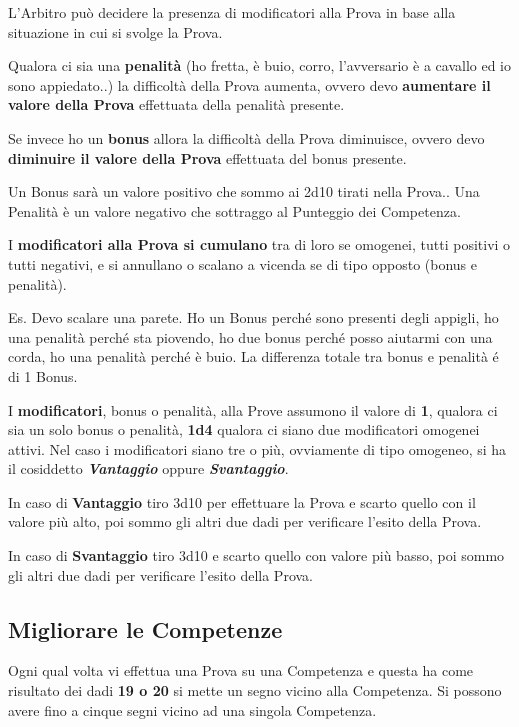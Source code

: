 \documentclass[12pt,a4paper,twoside,openany]{book}
\begin{document}
\begin{multicols}{2}
L'Arbitro può decidere la presenza di modificatori alla Prova in base alla situazione in cui si svolge la Prova.

Qualora ci sia una \textbf{penalità} (ho fretta, è buio, corro, l'avversario è a cavallo ed io sono appiedato..) la difficoltà della Prova aumenta, ovvero devo \textbf{aumentare il valore della Prova} effettuata della penalità presente.

Se invece ho un \textbf{bonus} allora la difficoltà della Prova diminuisce, ovvero devo \textbf{diminuire il valore della Prova} effettuata del bonus presente.

Un Bonus sarà un valore positivo che sommo ai 2d10 tirati nella Prova.. Una Penalità è un valore negativo che sottraggo al Punteggio dei Competenza.

I \textbf{modificatori alla Prova si cumulano} tra di loro se omogenei, tutti positivi o tutti negativi, e si annullano o scalano a vicenda se di tipo opposto (bonus e penalità).

Es. Devo scalare una parete. Ho un Bonus perché sono presenti degli appigli, ho una penalità perché sta piovendo, ho due bonus perché posso aiutarmi con una corda, ho una penalità perché è buio. La differenza totale tra bonus e penalità é di 1 Bonus.

I \textbf{modificatori}, bonus o penalità, alla Prove assumono il valore di \textbf{1}, qualora ci sia un solo bonus o penalità, \textbf{1d4} qualora ci siano due modificatori omogenei attivi. Nel caso i modificatori siano tre o più, ovviamente di tipo omogeneo, si ha il cosiddetto \textbf{\textit{Vantaggio}} oppure \textbf{\textit{Svantaggio}}.

In caso di \textbf{Vantaggio} tiro 3d10 per effettuare la Prova e scarto quello con il valore più alto, poi sommo gli altri due dadi per verificare l'esito della Prova.

In caso di \textbf{Svantaggio} tiro 3d10 e scarto quello con valore più basso, poi sommo gli altri due dadi per verificare l'esito della Prova. 

\subsection{Migliorare le Competenze}\hypertarget{Migliorare le Competenze}{} \label{Migliorare le Competenze}

Ogni qual volta vi effettua una Prova su una Competenza e questa ha come risultato dei dadi \textbf{19 o 20} si mette un segno vicino alla Competenza. Si possono avere fino a cinque segni vicino ad una singola Competenza.


\end{multicols}
\end{document}
